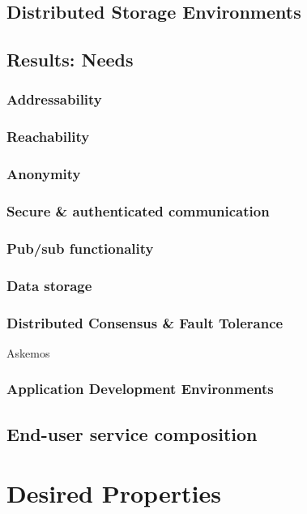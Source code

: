 \documentclass{article}
\begin{document}
{{%

\subsection{Distributed Storage Environments}

\subsection{Results: Needs}

\subsubsection{Addressability}
\subsubsection{Reachability}
\subsubsection{Anonymity}
\subsubsection{Secure \& authenticated communication}
\subsubsection{Pub/sub functionality}
\subsubsection{Data storage}
\subsubsection{Distributed Consensus \& Fault Tolerance}
	Askemos
\subsubsection{Application Development Environments}
\subsection{End-user service composition}

\section{Desired Properties}

}}
\end{document}
